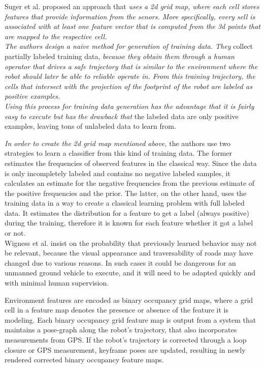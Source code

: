 \documentclass[12pt,a4paper]{report}
\begin{document}
	Suger et al. \cite{Suger} proposed an approach that \textit{uses a 2d grid map, where 
	each cell stores features that provide information from the senors. More 
	specifically, every sell is associated with at least one feature vector that is 
	computed from the 3d points that are mapped to the respective cell.
	\\
	The authors design a naive method for generation of training data. They} 
	collect partially labeled training data, \textit{because they obtain them through a 
	human operator that drives a safe trajectory that is similar to the 
	environment where the robot should later be able to reliable operate	in. From this 
	training trajectory, the cells that intersect with the projection of the footprint 
	of the robot are labeled as positive examples. 
	\\
	Using this process for training data generation has the advantage that it 
	is fairly easy to execute but has the drawback that} the labeled data are only 
	positive examples, leaving tons of unlabeled data to learn from.
	
	\textit{In order to create the 2d grid map mentioned above,} the authors use two strategies to learn a classifier from this kind of 
	training data. The former estimates the frequencies of observed	features in the 
	classical way. Since the data is only incompletely labeled and contains no 
	negative labeled samples, it calculates an estimate for the negative 
	frequencies from the previous estimate of the positive frequencies and the prior. The 
	latter, on the other hand, uses the training data in a way to create a classical 
	learning problem with full labeled data. It estimates the distribution for a 
	feature to get a label (always positive) during the training, therefore it is 
	known for each feature whether it got a label or not.
	\\
	
	Wigness et al. \cite{Wigness} insist on the probability that previously learned 
	behavior may not be relevant, because the visual appearance and traversability 
	of roads may have changed due to various reasons. In such cases it could be 
	dangerous for an unmanned ground vehicle to execute, and it will need to be 
	adapted quickly and with minimal human supervision.
	
	Environment features are encoded as binary occupancy grid maps, where 
	a grid cell in a feature map denotes the presence or absence of the feature 
	it is modeling. Each binary occupancy grid feature map is output from a 
	system that maintains a pose-graph along the robot’s trajectory, that also 
	incorporates measurements from GPS. If the robot’s trajectory is corrected 
	through a loop closure or GPS measurement, keyframe poses are updated, 
	resulting in newly rendered corrected binary occupancy feature maps.
	
\end{document}
